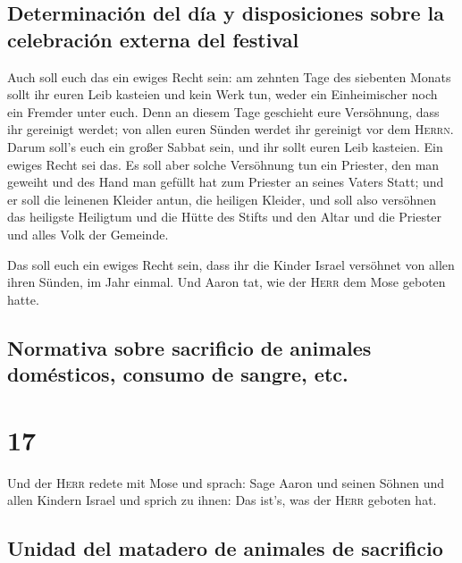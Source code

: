 \hypertarget{determinaciuxf3n-del-duxeda-y-disposiciones-sobre-la-celebraciuxf3n-externa-del-festival}{%
\subsection{Determinación del día y disposiciones sobre la celebración
externa del
festival}\label{determinaciuxf3n-del-duxeda-y-disposiciones-sobre-la-celebraciuxf3n-externa-del-festival}}

 Auch soll euch das ein ewiges Recht sein: am zehnten
Tage des siebenten Monats sollt ihr euren Leib kasteien und kein Werk
tun, weder ein Einheimischer noch ein Fremder unter euch.
 Denn an diesem Tage geschieht eure Versöhnung, dass ihr
gereinigt werdet; von allen euren Sünden werdet ihr gereinigt vor dem
\textsc{Herrn}.  Darum soll's euch ein großer Sabbat
sein, und ihr sollt euren Leib kasteien. Ein ewiges Recht sei das.
 Es soll aber solche Versöhnung tun ein Priester, den man
geweiht und des Hand man gefüllt hat zum Priester an seines Vaters
Statt; und er soll die leinenen Kleider antun, die heiligen Kleider,
 und soll also versöhnen das heiligste Heiligtum und die
Hütte des Stifts und den Altar und die Priester und alles Volk der
Gemeinde.

 Das soll euch ein ewiges Recht sein, dass ihr die Kinder
Israel versöhnet von allen ihren Sünden, im Jahr einmal. Und Aaron tat,
wie der \textsc{Herr} dem Mose geboten hatte.

\hypertarget{normativa-sobre-sacrificio-de-animales-domuxe9sticos-consumo-de-sangre-etc.}{%
\subsection{Normativa sobre sacrificio de animales domésticos, consumo
de sangre,
etc.}\label{normativa-sobre-sacrificio-de-animales-domuxe9sticos-consumo-de-sangre-etc.}}

\hypertarget{section-16}{%
\section{17}\label{section-16}}

 Und der \textsc{Herr} redete mit Mose und sprach:
 Sage Aaron und seinen Söhnen und allen Kindern Israel und
sprich zu ihnen: Das ist's, was der \textsc{Herr} geboten hat.

\hypertarget{unidad-del-matadero-de-animales-de-sacrificio}{%
\subsection{Unidad del matadero de animales de
sacrificio}\label{unidad-del-matadero-de-animales-de-sacrificio}}


